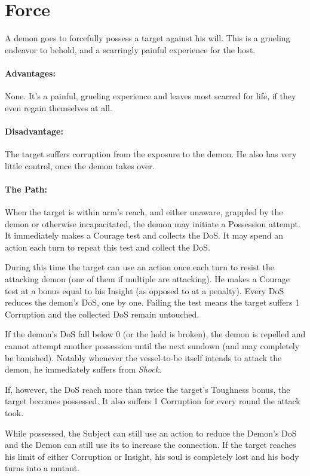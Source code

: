 \section{Force}
\label{possession:force}
A demon goes to forcefully possess a target against his will.
This is a grueling endeavor to behold,
and a scarringly painful experience for the host.
\paragraph{Advantages:}
None.
It's a painful, grueling experience and leaves most scarred for life, if they even regain themselves at all.
\paragraph{Disadvantage:}
The target suffers corruption from the exposure to the demon.
He also has very little control, once the demon takes over.
\paragraph{The Path:}
When the target is within arm's reach, and either unaware, grappled by the demon or otherwise incapacitated, the demon may initiate a Possession attempt.
It immediately makes a Courage test and collects the DoS.
It may spend an action each turn to repeat this test and collect the DoS.
\par \vspace{-5mm}
During this time the target can use an action once each turn to resist the attacking demon
	(one of them if multiple are attacking).
He makes a Courage test at a bonus equal to his Insight (as opposed to at a penalty).
Every DoS reduces the demon's DoS, one by one.
Failing the test means the target suffers 1 Corruption and the collected DoS remain untouched.
\par \vspace{-5mm}
If the demon's DoS fall below 0 (or the hold is broken), the demon is repelled and cannot attempt another possession until the next sundown (and may completely be banished).
Notably whenever the vessel-to-be itself intends to attack the demon, he immediately suffers from \emph{Shock}.
\par \vspace{-5mm}
If, however, the DoS reach more than twice the target's Toughness bonus, the target becomes possessed.
It also suffers 1 Corruption for every round the attack took.
\par \vspace{-5mm}
While possessed, the Subject can still use an action to reduce the Demon's DoS and the Demon can still use its to increase the connection.
If the target reaches his limit of either Corruption or Insight, his soul is completely lost and his body turns into a mutant.
